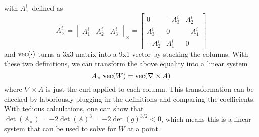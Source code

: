 \documentclass[../thesis.tex]{subfiles}
\begin{document}
with $A^i_{\times}$ defined as
$$A^i_{\times} = \begin{bmatrix}
  A^i_1 & A^i_2 & A^i_3
\end{bmatrix}_{\times} =
\begin{bmatrix}
  0 & -A^i_3 & A^i_2 \\
  A^i_3 & 0 & -A^i_1 \\
  -A^i_2 & A^i_1 & 0
\end{bmatrix}$$ and $\operatorname{vec}(\cdot)$ turns a 3x3-matrix into a 9x1-vector by stacking the columns.
With these two definitions, we can transform the above equality into a linear system
$$A_{\times} \operatorname{vec}(W) = \operatorname{vec} (\nabla \times A)$$
where $\nabla \times A$ is just the curl applied to each column. This transformation can be checked by laboriously plugging in the definitions and comparing the coefficients.
With tedious calculations, one can show that $\det(A_{\times})=-2\det(A)^3=-2\det(g)^{3/2}<0$, which
means this is a linear system that can be used to solve for $W$ at a point.
\end{document}
